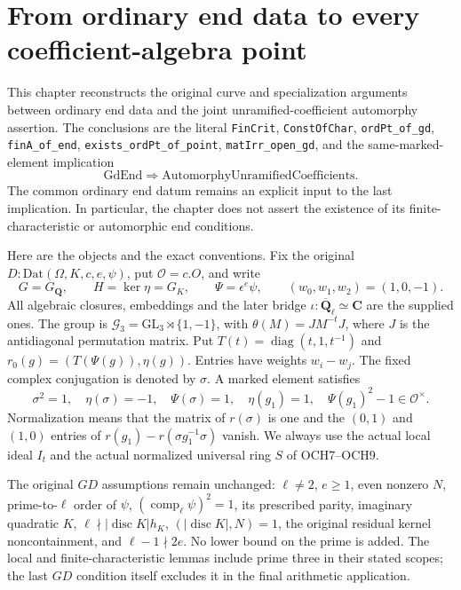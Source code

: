 \section{From ordinary end data to every coefficient-algebra point}
\label{sec:unramified-coefficient-extension-v49}

This chapter reconstructs the original curve and specialization arguments
between ordinary end data and the joint unramified-coefficient automorphy
assertion.  The conclusions are the literal \texttt{FinCrit},
\texttt{ConstOfChar}, \texttt{ordPt\_of\_gd},
\texttt{finA\_of\_end}, \texttt{exists\_ordPt\_of\_point},
\texttt{matIrr\_open\_gd}, and the same-marked-element implication
\[
 \mathrm{GdEnd}\Rightarrow\mathrm{AutomorphyUnramifiedCoefficients}.
\]
The common ordinary end datum remains an explicit input to the last
implication.  In particular, the chapter does not assert the existence of
its finite-characteristic or automorphic end conditions.

Here are the objects and the exact conventions.  Fix the original
\(D:\mathrm{Dat}(\Omega,K,c,e,\psi)\), put
\(\mathcal O=c.O\), and write
\[
 G=G_{\mathbf Q},\qquad H=\ker\eta=G_K,\qquad
 \Psi=\epsilon^e\psi,\qquad (w_0,w_1,w_2)=(1,0,-1).
 \tag{UCE.1}
\]
All algebraic closures, embeddings and the later bridge
\(\iota:\overline{\mathbf Q}_\ell\simeq\mathbf C\) are the supplied
ones.  The group is
\(\mathcal G_3=\mathrm{GL}_3\rtimes\{1,-1\}\), with
\(\theta(M)=JM^{-t}J\), where \(J\) is the antidiagonal permutation
matrix.  Put \(T(t)=\operatorname{diag}(t,1,t^{-1})\) and
\(r_0(g)=(T(\Psi(g)),\eta(g))\).  Entries have weights
\(w_i-w_j\).  The fixed complex conjugation is denoted by \(\sigma\).
A marked element satisfies
\[
 \sigma^2=1,\quad \eta(\sigma)=-1,\quad \Psi(\sigma)=1,
 \quad\eta(g_1)=1,\quad \Psi(g_1)^2-1\in\mathcal O^\times.
 \tag{UCE.2}
\]
Normalization means that the matrix of \(r(\sigma)\) is one and the
\((0,1)\) and \((1,0)\) entries of
\(r(g_1)-r(\sigma g_1^{-1}\sigma)\) vanish.  We always use the actual
local ideal \(I_t\) and the actual normalized universal ring \(S\)
of OCH7--OCH9.

The original \(GD\) assumptions remain unchanged: \(\ell\ne2\),
\(e\ge1\), even nonzero \(N\), prime-to-\(\ell\) order of
\(\psi\), \((\operatorname{comp}_\ell\psi)^2=1\), its prescribed
parity, imaginary quadratic \(K\),
\(\ell\nmid |\operatorname{disc}K|h_K\),
\((|\operatorname{disc}K|,N)=1\), the original residual kernel
noncontainment, and \(\ell-1\nmid2e\).  No lower bound on the prime
is added.  The local and finite-characteristic lemmas include prime
three in their stated scopes; the last \(GD\) condition itself excludes
it in the final arithmetic application.

